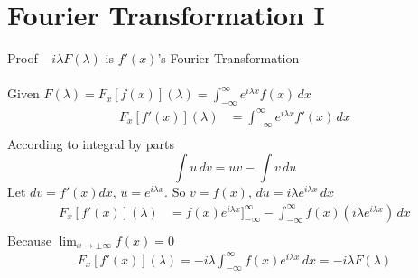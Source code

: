 \documentclass[12pt]{article}
\begin{document}
 

\rhead{\today}
 
\section*{Fourier Transformation I}
Proof $-i\lambda F(\lambda)$ is $f'(x)$'s Fourier Transformation\\\\
Given $F(\lambda) = F_x[f(x)](\lambda) = \int_{-\infty}^{\infty} e^{i\lambda x} f(x) \, dx$
\newline
\begin{align*}
    F_x[f'(x)](\lambda) & = \int_{-\infty}^{\infty} e^{i\lambda x} f'(x) \, dx \\
\end{align*}
According to integral by parts\\
\[
    \int u \, dv = uv - \int v \, du
\]  
\newline
Let $dv = f'(x)dx$, $u = e^{i\lambda x}$. So $v = f(x)$, $du = i\lambda e^{i\lambda x}\, dx$\\
\begin{align*}
    F_x[f'(x)](\lambda) & = f(x)e^{i \lambda x}\Big]_{-\infty}^{\infty} - \int_{-\infty}^{\infty}f(x)(i\lambda e^{i \lambda x})\,  dx\\
\end{align*}
Because $\lim_{x\to\pm\infty}f(x)=0$\\
\begin{align*}
    F_x[f'(x)](\lambda) = -i\lambda \int_{-\infty}^{\infty}f(x)e^{i \lambda x}\, dx = -i\lambda F(\lambda)
\end{align*}
\end{document}
